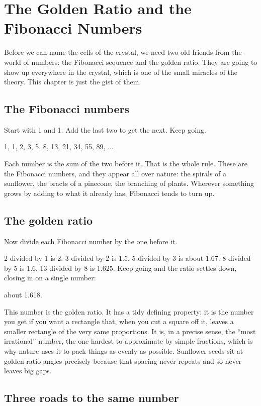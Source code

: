 \section{The Golden Ratio and the Fibonacci Numbers}

Before we can name the cells of the crystal, we need two old friends from the world of numbers: the Fibonacci sequence and the golden ratio. They are going to show up everywhere in the crystal, which is one of the small miracles of the theory. This chapter is just the gist of them.

\subsection{The Fibonacci numbers}

Start with 1 and 1. Add the last two to get the next. Keep going.

1, 1, 2, 3, 5, 8, 13, 21, 34, 55, 89, ...

Each number is the sum of the two before it. That is the whole rule. These are the Fibonacci numbers, and they appear all over nature: the spirals of a sunflower, the bracts of a pinecone, the branching of plants. Wherever something grows by adding to what it already has, Fibonacci tends to turn up.

\subsection{The golden ratio}

Now divide each Fibonacci number by the one before it.

2 divided by 1 is 2. 3 divided by 2 is 1.5. 5 divided by 3 is about 1.67. 8 divided by 5 is 1.6. 13 divided by 8 is 1.625. Keep going and the ratio settles down, closing in on a single number:

about 1.618.

This number is the golden ratio. It has a tidy defining property: it is the number you get if you want a rectangle that, when you cut a square off it, leaves a smaller rectangle of the very same proportions. It is, in a precise sense, the ``most irrational'' number, the one hardest to approximate by simple fractions, which is why nature uses it to pack things as evenly as possible. Sunflower seeds sit at golden-ratio angles precisely because that spacing never repeats and so never leaves big gaps.

\subsection{Three roads to the same number}

